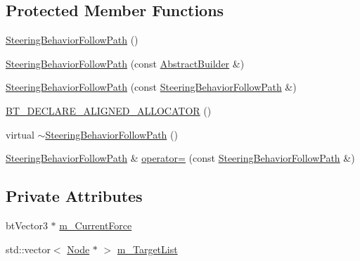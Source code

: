 \subsection*{Protected Member Functions}
\begin{DoxyCompactItemize}
\item 
\mbox{\hyperlink{classnjli_1_1_steering_behavior_follow_path_a23c6d21bb564f8dcc2e131307e5aced3}{Steering\+Behavior\+Follow\+Path}} ()
\item 
\mbox{\hyperlink{classnjli_1_1_steering_behavior_follow_path_a8c4fe7fcfec9e8c57f206bef9ba3d32f}{Steering\+Behavior\+Follow\+Path}} (const \mbox{\hyperlink{classnjli_1_1_abstract_builder}{Abstract\+Builder}} \&)
\item 
\mbox{\hyperlink{classnjli_1_1_steering_behavior_follow_path_a0de496b4c31a246ba106ea78c27696dd}{Steering\+Behavior\+Follow\+Path}} (const \mbox{\hyperlink{classnjli_1_1_steering_behavior_follow_path}{Steering\+Behavior\+Follow\+Path}} \&)
\item 
\mbox{\hyperlink{classnjli_1_1_steering_behavior_follow_path_a1d94de6a37da4654ee94ebf7791078ed}{B\+T\+\_\+\+D\+E\+C\+L\+A\+R\+E\+\_\+\+A\+L\+I\+G\+N\+E\+D\+\_\+\+A\+L\+L\+O\+C\+A\+T\+OR}} ()
\item 
virtual \mbox{\hyperlink{classnjli_1_1_steering_behavior_follow_path_aa848fc87cfe7536eb81bc376a2291ff0}{$\sim$\+Steering\+Behavior\+Follow\+Path}} ()
\item 
\mbox{\hyperlink{classnjli_1_1_steering_behavior_follow_path}{Steering\+Behavior\+Follow\+Path}} \& \mbox{\hyperlink{classnjli_1_1_steering_behavior_follow_path_aeecda49cfcc232396ee803739ebbe1c2}{operator=}} (const \mbox{\hyperlink{classnjli_1_1_steering_behavior_follow_path}{Steering\+Behavior\+Follow\+Path}} \&)
\end{DoxyCompactItemize}
\subsection*{Private Attributes}
\begin{DoxyCompactItemize}
\item 
bt\+Vector3 $\ast$ \mbox{\hyperlink{classnjli_1_1_steering_behavior_follow_path_a2713eb2e2744fbdf32bfde7b93509ba3}{m\+\_\+\+Current\+Force}}
\item 
std\+::vector$<$ \mbox{\hyperlink{classnjli_1_1_node}{Node}} $\ast$ $>$ \mbox{\hyperlink{classnjli_1_1_steering_behavior_follow_path_a420b4cfcf8d7956a60f915a8c1db53cb}{m\+\_\+\+Target\+List}}
\end{DoxyCompactItemize}

